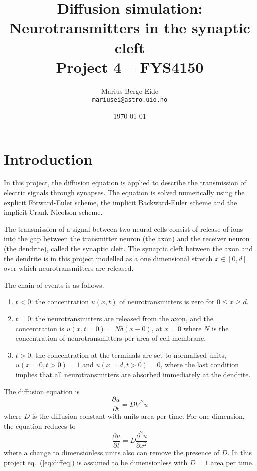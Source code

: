 \documentclass[a4paper,11pt]{article}
\date{\today}
\title{Diffusion simulation: Neurotransmitters in the synaptic cleft\\ \small{Project 4 -- FYS4150}}
\author{Marius Berge Eide \\
\texttt{mariusei@astro.uio.no}}
\begin{document}
\onecolumn
\maketitle{}

\begin{abstract}
\end{abstract}

\section{Introduction}
In this project, the diffusion equation is applied to describe the transmission of electric signals through synapses. The equation is solved numerically using the explicit Forward-Euler scheme, the implicit Backward-Euler scheme and the implicit Crank-Nicolson scheme.

The transmission of a signal between two neural cells consist of release of ions into the gap between the transmitter neuron (the axon) and the receiver neuron (the dendrite), called the synaptic cleft. The synaptic cleft between the axon and the dendrite is in this project modelled as a one dimensional stretch $x \in [0,d]$ over which neurotransmitters are released.

The chain of events is as follows:
\begin{enumerate}
    \item $t<0$: the concentration $u(x,t)$ of neurotransmitters is zero for $0 \leq x \geq d$.
    \item $t=0$: the neurotransmitters are released from the axon, and the concentration is $u(x,t=0) = N \delta(x-0)$, at $x=0$ where $N$ is the concentration of neurotransmitters per area of cell membrane.
    \item $t>0$: the concentration at the terminals are set to normalised units, $u(x=0, t>0) = 1$ and $u(x=d, t>0) = 0$, where the last condition implies that all neurotransmitters are absorbed immediately at the dendrite.
\end{enumerate}

The diffusion equation is
\begin{equation}
    \frac{\partial u}{\partial t} = D \nabla^2 u
    \label{eq:diff-general}
\end{equation}
where $D$ is the diffusion constant with units area per time. For one dimension, the equation reduces to
\begin{equation}
    \frac{\partial u}{\partial t} = D \frac{\partial^2 u}{\partial x^2}
    \label{eq:diffeq}
\end{equation}
where a change to dimensionless units also can remove the presence of $D$. In this project eq.~(\ref{eq:diffeq}) is assumed to be dimensionless with $D=1$ area per time.
\end{document}

